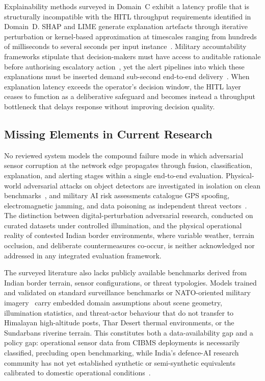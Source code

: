 Explainability methods surveyed in Domain~C exhibit a latency profile that is structurally incompatible with the HITL throughput requirements identified in Domain~D. SHAP and LIME generate explanation artefacts through iterative perturbation or kernel-based approximation at timescales ranging from hundreds of milliseconds to several seconds per input instance~\cite{zhang2022xai}. Military accountability frameworks stipulate that decision-makers must have access to auditable rationale before authorising escalatory action~\cite{military2024xai}, yet the alert pipelines into which these explanations must be inserted demand sub-second end-to-end delivery~\cite{hitl2023trust}. When explanation latency exceeds the operator's decision window, the HITL layer ceases to function as a deliberative safeguard and becomes instead a throughput bottleneck that delays response without improving decision quality.

\subsection{Missing Elements in Current Research}

No reviewed system models the compound failure mode in which adversarial sensor corruption at the network edge propagates through fusion, classification, explanation, and alerting stages within a single end-to-end evaluation. Physical-world adversarial attacks on object detectors are investigated in isolation on clean benchmarks~\cite{advyolo2022}, and military AI risk assessments catalogue GPS spoofing, electromagnetic jamming, and data poisoning as independent threat vectors~\cite{milai2025risk}. The distinction between digital-perturbation adversarial research, conducted on curated datasets under controlled illumination, and the physical operational reality of contested Indian border environments, where variable weather, terrain occlusion, and deliberate countermeasures co-occur, is neither acknowledged nor addressed in any integrated evaluation framework.

The surveyed literature also lacks publicly available benchmarks derived from Indian border terrain, sensor configurations, or threat typologies. Models trained and validated on standard surveillance benchmarks or NATO-oriented military imagery~\cite{satellite2024yolov8} carry embedded domain assumptions about scene geometry, illumination statistics, and threat-actor behaviour that do not transfer to Himalayan high-altitude posts, Thar Desert thermal environments, or the Sundarbans riverine terrain. This constitutes both a data-availability gap and a policy gap: operational sensor data from CIBMS deployments is necessarily classified, precluding open benchmarking, while India's defence-AI research community has not yet established synthetic or semi-synthetic equivalents calibrated to domestic operational conditions~\cite{indiaai2024springer}.

